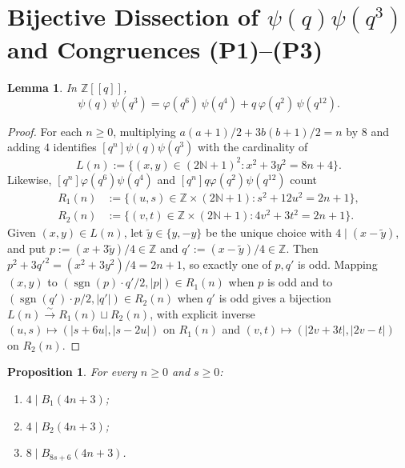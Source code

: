\documentclass[11pt]{article}
\newtheorem{lemma}[theorem]{Lemma}
\newtheorem{proposition}[theorem]{Proposition}
\begin{document}
\section{Bijective Dissection of $\psi(q)\psi(q^3)$ and Congruences (P1)--(P3)}

\begin{lemma}\label{lem:psi3}
In $\mathbb{Z}[[q]]$,
\[
\psi(q)\,\psi(q^3) = \varphi(q^6)\,\psi(q^4) + q\,\varphi(q^2)\,\psi(q^{12}).
\]
\end{lemma}

\begin{proof}
For each $n \ge 0$, multiplying $a(a+1)/2 + 3b(b+1)/2 = n$ by $8$ and adding $4$ identifies $[q^n]\psi(q)\psi(q^3)$ with the cardinality of
\[
L(n) := \{(x, y) \in (2\mathbb{N}+1)^2 : x^2 + 3y^2 = 8n + 4\}.
\]
Likewise, $[q^n]\varphi(q^6)\psi(q^4)$ and $[q^n]q\varphi(q^2)\psi(q^{12})$ count
\begin{align*}
R_1(n) &:= \{(u, s) \in \mathbb{Z} \times (2\mathbb{N}+1) : s^2 + 12u^2 = 2n + 1\}, \\
R_2(n) &:= \{(v, t) \in \mathbb{Z} \times (2\mathbb{N}+1) : 4v^2 + 3t^2 = 2n + 1\}.
\end{align*}
Given $(x, y) \in L(n)$, let $\tilde{y} \in \{y, -y\}$ be the unique choice with $4 \mid (x - \tilde{y})$, and put $p := (x + 3\tilde{y})/4 \in \mathbb{Z}$ and $q' := (x - \tilde{y})/4 \in \mathbb{Z}$. Then $p^2 + 3q'^2 = (x^2 + 3y^2)/4 = 2n+1$, so exactly one of $p, q'$ is odd. Mapping $(x, y)$ to $(\operatorname{sgn}(p)\cdot q'/2, |p|) \in R_1(n)$ when $p$ is odd and to $(\operatorname{sgn}(q')\cdot p/2, |q'|) \in R_2(n)$ when $q'$ is odd gives a bijection $L(n) \xrightarrow{\sim} R_1(n) \sqcup R_2(n)$, with explicit inverse $(u, s) \mapsto (|s+6u|, |s-2u|)$ on $R_1(n)$ and $(v, t) \mapsto (|2v+3t|, |2v-t|)$ on $R_2(n)$.
\end{proof}

\begin{proposition}\label{prop:P123}
For every $n \ge 0$ and $s \ge 0$:
\begin{enumerate}
\item[(P1)] $4 \mid B_1(4n+3)$;
\item[(P2)] $4 \mid B_2(4n+3)$;
\item[(P3)] $8 \mid B_{8s+6}(4n+3)$.
\end{enumerate}
\end{proposition}
\end{document}
